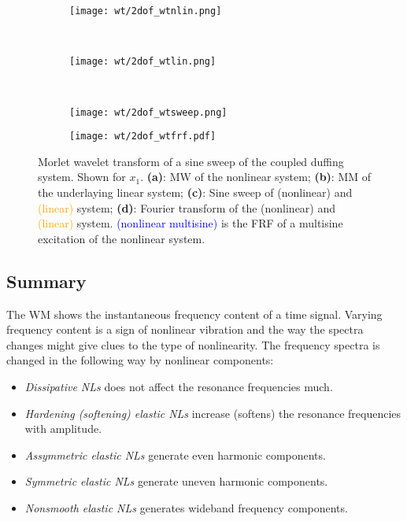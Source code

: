 \begin{figure}[!ht]
  \centering
  \begin{subfigure}[b]{0.48\textwidth}
    \texttt{[image: wt/2dof\_wtnlin.png]}
    \caption{}
  \end{subfigure}
  ~
  \begin{subfigure}[b]{0.48\textwidth}
    \texttt{[image: wt/2dof\_wtlin.png]}
    \caption{}
  \end{subfigure}
  \\
  \begin{subfigure}[b]{0.49\textwidth}
    \texttt{[image: wt/2dof\_wtsweep.png]}
    \caption{}
  \end{subfigure}
  \begin{subfigure}[b]{0.49\textwidth}
    \texttt{[image: wt/2dof\_wtfrf.pdf]}
    \caption{}
  \end{subfigure}
  \caption{Morlet wavelet transform of a sine sweep of the coupled duffing
    system. Shown for $x_1$.
    \textbf{(a)}: MW of the nonlinear system;
    \textbf{(b)}: MM of the underlaying linear system;
    \textbf{(c)}: Sine sweep of
    \sampleline{}(nonlinear) and
    \textcolor{orange}{(linear)} system;
    \textbf{(d)}: Fourier transform of the
    \sampleline{}(nonlinear) and
    \textcolor{orange}{(linear)} system.
    \textcolor{blue}{\sampleline{}(nonlinear multisine)} is the FRF of a
    multisine excitation of the nonlinear system.
  }
  \label{fig:mw_2dof}
\end{figure}


\subsection{Summary}
\label{sec:wt_transform}

The WM shows the instantaneous frequency content of a time signal. Varying
frequency content is a sign of nonlinear vibration and the way the spectra
changes might give clues to the type of nonlinearity.
The frequency spectra is changed in the following way by nonlinear components:

\begin{itemize}
\item \textit{Dissipative NLs} does not affect the resonance frequencies much.
\item \textit{Hardening (softening) elastic NLs} increase (softens) the resonance
  frequencies with amplitude.
\item \textit{Assymmetric elastic NLs} generate even harmonic components.
\item \textit{Symmetric elastic NLs} generate uneven harmonic components.
\item \textit{Nonsmooth elastic NLs} generates wideband frequency components.
\end{itemize}

